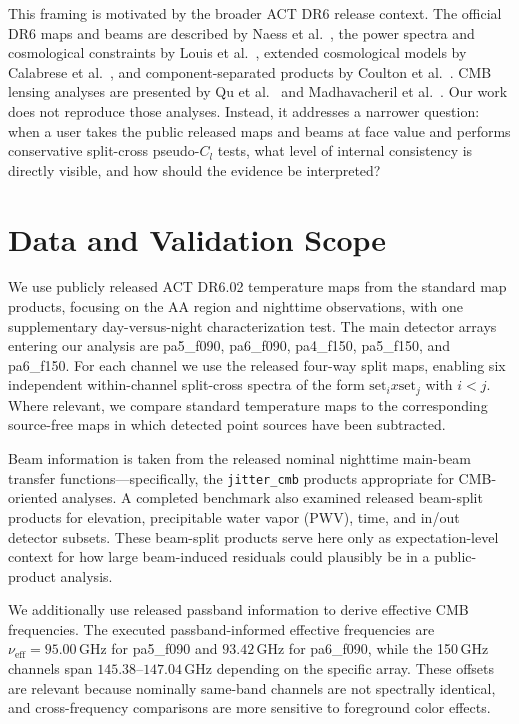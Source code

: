 \documentclass[twocolumn,showpacs,preprintnumbers,amsmath,amssymb,floatfix,prd]{revtex4-2}
\def\ell{l}%
\def\times{x}%
\begin{document}
This framing is motivated by the broader ACT DR6 release context.
The official DR6 maps and beams are described by Naess et al.~\cite{Naess2025}, the power spectra and cosmological constraints by Louis et al.~\cite{Louis2025}, extended cosmological models by Calabrese et al.~\cite{Calabrese2025}, and component-separated products by Coulton et al.~\cite{Coulton2024}.
CMB lensing analyses are presented by Qu et al.~\cite{Qu2024} and Madhavacheril et al.~\cite{Madhavacheril2024}.
Our work does not reproduce those analyses.
Instead, it addresses a narrower question: when a user takes the public released maps and beams at face value and performs conservative split-cross pseudo-$C_\ell$ tests, what level of internal consistency is directly visible, and how should the evidence be interpreted?

\section{Data and Validation Scope}\label{sec:data}

We use publicly released ACT DR6.02 temperature maps from the standard map products, focusing on the AA region and nighttime observations, with one supplementary day-versus-night characterization test.
The main detector arrays entering our analysis are pa5\_f090, pa6\_f090, pa4\_f150, pa5\_f150, and pa6\_f150.
For each channel we use the released four-way split maps, enabling six independent within-channel split-cross spectra of the form $\mathrm{set}_i \times \mathrm{set}_j$ with $i < j$.
Where relevant, we compare standard temperature maps to the corresponding source-free maps in which detected point sources have been subtracted.

Beam information is taken from the released nominal nighttime main-beam transfer functions---specifically, the \texttt{jitter\_cmb} products appropriate for CMB-oriented analyses.
A completed benchmark also examined released beam-split products for elevation, precipitable water vapor (PWV), time, and in/out detector subsets.
These beam-split products serve here only as expectation-level context for how large beam-induced residuals could plausibly be in a public-product analysis.

We additionally use released passband information to derive effective CMB frequencies.
The executed passband-informed effective frequencies are $\nu_\mathrm{eff} = 95.00\,\mathrm{GHz}$ for pa5\_f090 and $93.42\,\mathrm{GHz}$ for pa6\_f090, while the 150\,GHz channels span $145.38$--$147.04\,\mathrm{GHz}$ depending on the specific array.
These offsets are relevant because nominally same-band channels are not spectrally identical, and cross-frequency comparisons are more sensitive to foreground color effects.
\end{document}
